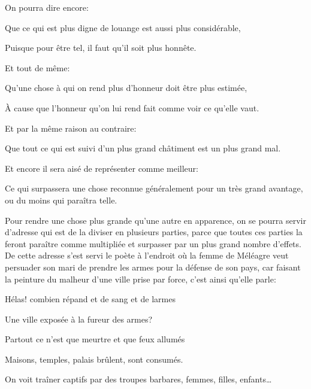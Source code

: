 On pourra dire encore:

\begin{emphpar}
    Que ce qui est plus digne de louange est aussi plus considérable,
\end{emphpar}

Puisque pour être tel, il faut qu'il soit plus honnête.

\bigbreak

Et tout de même:

\begin{emphpar}
    Qu'une chose à qui on rend plus d'honneur doit être plus estimée,
\end{emphpar}

À cause que l'honneur qu'on lui rend fait comme voir ce qu'elle vaut.

Et par la même raison au contraire:

\begin{emphpar}
    Que tout ce qui est suivi d'un plus grand châtiment est un plus grand mal.
\end{emphpar}

\bigbreak

Et encore il sera aisé de représenter comme meilleur:

\begin{emphpar}
    Ce qui surpassera une chose reconnue généralement pour un très grand avantage, ou du moins qui paraîtra telle.
\end{emphpar}

\bigbreak

Pour rendre une chose plus grande qu'une autre en apparence, on se pourra servir d'adresse qui est de la diviser en
plusieurs parties, parce que toutes ces parties la feront paraître comme multipliée et surpasser par un plus grand
nombre d'effets. De cette adresse s'est servi le poète à l'endroit où la femme de Méléagre veut persuader son mari de
prendre les armes pour la défense de son pays, car faisant la peinture du malheur d'une ville prise par force, c'est
ainsi qu'elle parle:

\begin{emphpar}
   Hélas! combien répand et de sang et de larmes

   Une ville exposée à la fureur des armes?

   Partout ce n'est que meurtre et que feux allumés

   Maisons, temples, palais brûlent, sont consumés.

   On voit traîner captifs par des troupes barbares, femmes, filles, enfants\dots
\end{emphpar}

